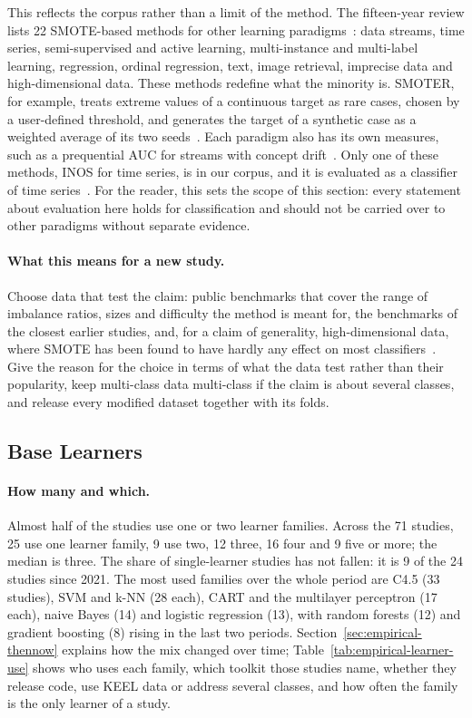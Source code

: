 This reflects the corpus rather than a limit of the method. The fifteen-year review lists 22 SMOTE-based methods for other learning paradigms~\parencite{fernandez2018smote}: data streams, time series, semi-supervised and active learning, multi-instance and multi-label learning, regression, ordinal regression, text, image retrieval, imprecise data and high-dimensional data. These methods redefine what the minority is. SMOTER, for example, treats extreme values of a continuous target as rare cases, chosen by a user-defined threshold, and generates the target of a synthetic case as a weighted average of its two seeds~\parencite{torgo2013smote}. Each paradigm also has its own measures, such as a prequential AUC for streams with concept drift~\parencite{brzezinski2017prequential}. Only one of these methods, INOS for time series, is in our corpus, and it is evaluated as a classifier of time series~\parencite{cao2013inos}. For the reader, this sets the scope of this section: every statement about evaluation here holds for classification and should not be carried over to other paradigms without separate evidence.

\paragraph{What this means for a new study.} Choose data that test the claim: public benchmarks that cover the range of imbalance ratios, sizes and difficulty the method is meant for, the benchmarks of the closest earlier studies, and, for a claim of generality, high-dimensional data, where SMOTE has been found to have hardly any effect on most classifiers~\parencite{blagus2013smote}. Give the reason for the choice in terms of what the data test rather than their popularity, keep multi-class data multi-class if the claim is about several classes, and release every modified dataset together with its folds.

\subsection{Base Learners}
\label{sec:empirical-learners}

\paragraph{How many and which.} Almost half of the studies use one or two learner families. Across the 71 studies, 25 use one learner family, 9 use two, 12 three, 16 four and 9 five or more; the median is three. The share of single-learner studies has not fallen: it is 9 of the 24 studies since 2021. The most used families over the whole period are C4.5 (33 studies), SVM and k-NN (28 each), CART and the multilayer perceptron (17 each), naive Bayes (14) and logistic regression (13), with random forests (12) and gradient boosting (8) rising in the last two periods. Section~\ref{sec:empirical-thennow} explains how the mix changed over time; Table~\ref{tab:empirical-learner-use} shows who uses each family, which toolkit those studies name, whether they release code, use KEEL data or address several classes, and how often the family is the only learner of a study.

